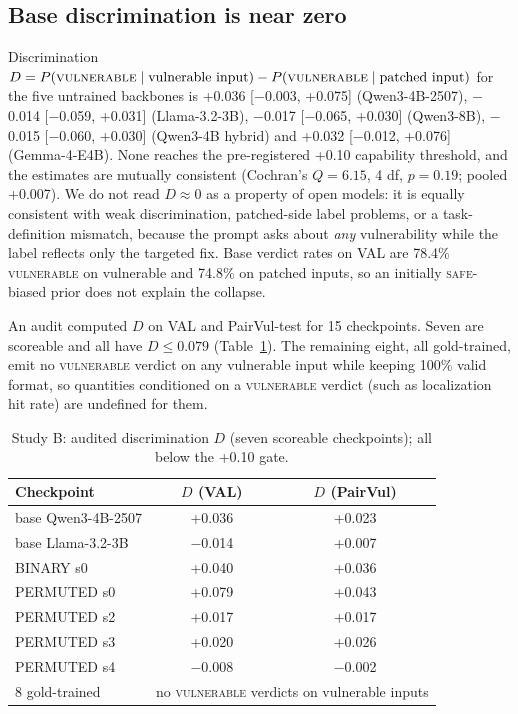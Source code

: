 \documentclass[journal]{IEEEtran}
\newcommand{\vuln}{\textsc{vulnerable}}
\newcommand{\safe}{\textsc{safe}}
\begin{document}
\subsection{Base discrimination is near zero}
Discrimination $D=P(\vuln\mid\text{vulnerable input})-P(\vuln\mid\text{patched input})$ for the five untrained backbones is +0.036 [$-$0.003, +0.075] (Qwen3-4B-2507), $-$0.014 [$-$0.059, +0.031] (Llama-3.2-3B), $-$0.017 [$-$0.065, +0.030] (Qwen3-8B), $-$0.015 [$-$0.060, +0.030] (Qwen3-4B hybrid) and +0.032 [$-$0.012, +0.076] (Gemma-4-E4B). None reaches the pre-registered +0.10 capability threshold, and the estimates are mutually consistent (Cochran's $Q{=}6.15$, 4 df, $p{=}0.19$; pooled +0.007). We do not read $D\approx0$ as a property of open models: it is equally consistent with weak discrimination, patched-side label problems, or a task-definition mismatch, because the prompt asks about \emph{any} vulnerability while the label reflects only the targeted fix. Base verdict rates on VAL are 78.4\% \vuln{} on vulnerable and 74.8\% on patched inputs, so an initially \safe{}-biased prior does not explain the collapse.

An audit computed $D$ on VAL and PairVul-test for 15 checkpoints. Seven are scoreable and all have $D\le0.079$ (Table~\ref{tab:h3}). The remaining eight, all gold-trained, emit no \vuln{} verdict on any vulnerable input while keeping 100\% valid format, so quantities conditioned on a \vuln{} verdict (such as localization hit rate) are undefined for them.

\begin{table}[t]
\centering\footnotesize\setlength{\tabcolsep}{4pt}
\caption{Study B: audited discrimination $D$ (seven scoreable checkpoints); all below the +0.10 gate.}
\label{tab:h3}
\begin{tabular}{lcc}
\toprule
Checkpoint & $D$ (VAL) & $D$ (PairVul)\\
\midrule
base Qwen3-4B-2507 & +0.036 & +0.023\\
base Llama-3.2-3B & $-$0.014 & +0.007\\
BINARY s0 & +0.040 & +0.036\\
PERMUTED s0 & +0.079 & +0.043\\
PERMUTED s2 & +0.017 & +0.017\\
PERMUTED s3 & +0.020 & +0.026\\
PERMUTED s4 & $-$0.008 & $-$0.002\\
8 gold-trained & \multicolumn{2}{c}{no \vuln{} verdicts on vulnerable inputs}\\
\bottomrule
\end{tabular}
\end{table}
\end{document}
